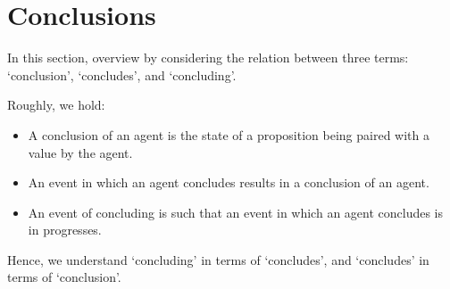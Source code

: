\section{Conclusions}
\label{cha:clar:sec:Cons}

\begin{note}
  In this section, overview by considering the relation between three terms:
  `conclusion', `concludes', and `concluding'.

  Roughly, we hold:

  \begin{itemize}
  \item
    A conclusion of an agent is the state of a proposition being paired with a value by the agent.
  \item
    An event in which an agent concludes results in a conclusion of an agent.
  \item
    An event of concluding is such that an event in which an agent concludes is in progresses.
  \end{itemize}

  Hence, we understand `concluding' in terms of `concludes', and `concludes' in terms of `conclusion'.
\end{note}






